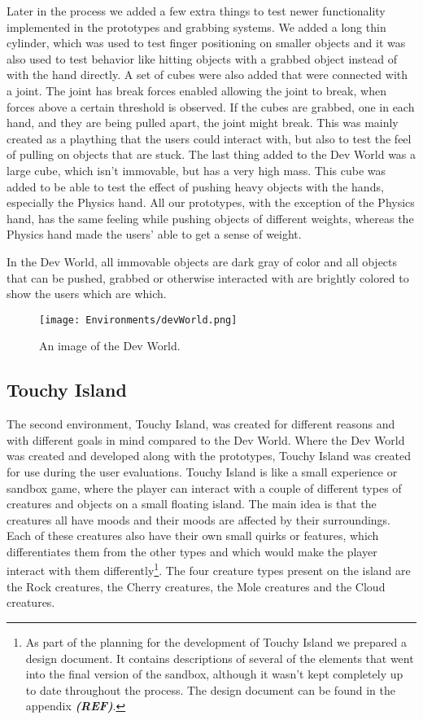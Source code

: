 Later in the process we added a few extra things to test newer functionality implemented in the prototypes and grabbing systems. We added a long thin cylinder, which was used to test finger positioning on smaller objects and it was also used to test behavior like hitting objects with a grabbed object instead of with the hand directly. A set of cubes were also added that were connected with a joint. The joint has break forces enabled allowing the joint to break, when forces above a certain threshold is observed. If the cubes are grabbed, one in each hand, and they are being pulled apart, the joint might break. This was mainly created as a plaything that the users could interact with, but also to test the feel of pulling on objects that are stuck. The last thing added to the Dev World was a large cube, which isn't immovable, but has a very high mass. This cube was added to be able to test the effect of pushing heavy objects with the hands, especially the Physics hand. All our prototypes, with the exception of the Physics hand, has the same feeling while pushing objects of different weights, whereas the Physics hand made the users' able to get a sense of weight.

In the Dev World, all immovable objects are dark gray of color and all objects that can be pushed, grabbed or otherwise interacted with are brightly colored to show the users which are which.

\begin{figure}[h]
\centering
\texttt{[image: Environments/devWorld.png]}
\caption{An image of the Dev World.}
\label{fig:devWorld}
\end{figure}

\subsection{Touchy Island}
\label{subsec:touchyIsland}
The second environment, Touchy Island, was created for different reasons and with different goals in mind compared to the Dev World. Where the Dev World was created and developed along with the prototypes, Touchy Island was created for use during the user evaluations. Touchy Island is like a small experience or sandbox game, where the player can interact with a couple of different types of creatures and objects on a small floating island. The main idea is that the creatures all have moods and their moods are affected by their surroundings. Each of these creatures also have their own small quirks or features, which differentiates them from the other types and which would make the player interact with them differently\footnote{As part of the planning for the development of Touchy Island we prepared a design document. It contains descriptions of several of the elements that went into the final version of the sandbox, although it wasn't kept completely up to date throughout the process. The design document can be found in the appendix \textbf{\textit{(REF)}}.}. The four creature types present on the island are the Rock creatures, the Cherry creatures, the Mole creatures and the Cloud creatures.

